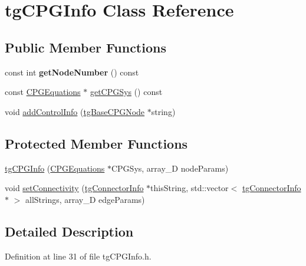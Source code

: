 \hypertarget{classtg_c_p_g_info}{\section{tg\-C\-P\-G\-Info Class Reference}
\label{classtg_c_p_g_info}
}
\subsection*{Public Member Functions}
\begin{DoxyCompactItemize}
\item 
\hypertarget{classtg_c_p_g_info_a4469e37ac5f58284c5907582dc30346c}{const int {\bfseries get\-Node\-Number} () const }\label{classtg_c_p_g_info_a4469e37ac5f58284c5907582dc30346c}

\item 
const \hyperlink{class_c_p_g_equations}{C\-P\-G\-Equations} $\ast$ \hyperlink{classtg_c_p_g_info_ac11605f641e691ac369ce4bff3958409}{get\-C\-P\-G\-Sys} () const 
\item 
void \hyperlink{classtg_c_p_g_info_a5bc9ebf51c48c38e3c079047bdfaa41f}{add\-Control\-Info} (\hyperlink{classtg_base_c_p_g_node}{tg\-Base\-C\-P\-G\-Node} $\ast$string)
\end{DoxyCompactItemize}
\subsection*{Protected Member Functions}
\begin{DoxyCompactItemize}
\item 
\hyperlink{classtg_c_p_g_info_aadfe544fa67d2255e08a73ac8c34a529}{tg\-C\-P\-G\-Info} (\hyperlink{class_c_p_g_equations}{C\-P\-G\-Equations} $\ast$C\-P\-G\-Sys, array\-\_\-D node\-Params)
\item 
void \hyperlink{classtg_c_p_g_info_ae6196de220c88e8631b863e0d63d1d7f}{set\-Connectivity} (\hyperlink{classtg_connector_info}{tg\-Connector\-Info} $\ast$this\-String, std\-::vector$<$ \hyperlink{classtg_connector_info}{tg\-Connector\-Info} $\ast$ $>$ all\-Strings, array\-\_\-D edge\-Params)
\end{DoxyCompactItemize}


\subsection{Detailed Description}


Definition at line 31 of file tg\-C\-P\-G\-Info.\-h.



